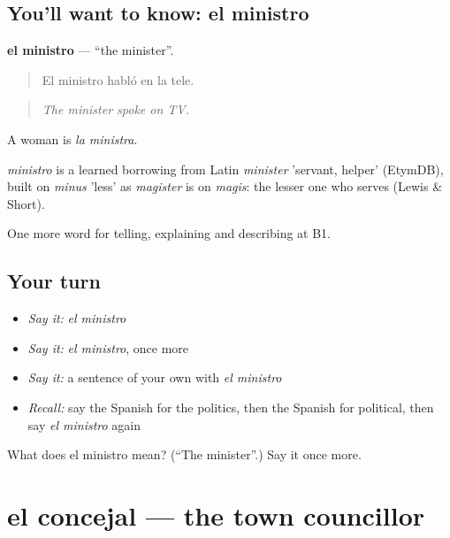 \subsection*{You'll want to know: el ministro}
\textbf{el ministro} — \textquotedblleft{}the minister\textquotedblright{}.

\begin{quote}
El ministro habló en la tele.
\end{quote}

\begin{quote}
\emph{The minister spoke on TV.}
\end{quote}

A woman is \emph{la ministra}.

\begin{cousinweb}
\emph{ministro} is a learned borrowing from Latin \emph{minister} 'servant, helper' (EtymDB), built on \emph{minus} 'less' as \emph{magister} is on \emph{magis}: the lesser one who serves (Lewis \& Short).
\end{cousinweb}

\begin{grammarlens}[title={What you've built}]
One more word for telling, explaining and describing at B1.
\end{grammarlens}

\subsection*{Your turn}
\begin{itemize}
\raggedright
  \item \emph{Say it:} \emph{el ministro}
  \item \emph{Say it:} \emph{el ministro}, once more
  \item \emph{Say it:} a sentence of your own with \emph{el ministro}
  \item \emph{Recall:} say the Spanish for the politics, then the Spanish for political, then say \emph{el ministro} again
\end{itemize}

\begin{tcolorbox}[breakable,colback=teal!4,colframe=teal!35!black,title={Before you move on}]
What does el ministro mean? (\textquotedblleft{}The minister\textquotedblright{}.) Say it once more.
\end{tcolorbox}
\section[el concejal]{el concejal — the town councillor}

